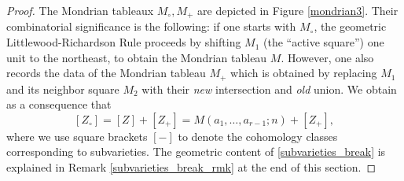 \begin{proof}
The Mondrian tableaux $M_\circ,M_+$ are depicted in Figure \ref{mondrian3}. Their combinatorial significance is the following: if one starts with $M_\circ$, the geometric Littlewood-Richardson Rule \cite[Algorithm 3.12, step GA2]{Cos09} proceeds by shifting $M_1$ (the ``active square'') one unit to the northeast, to obtain the Mondrian tableau $M$. However, one also records the data of the Mondrian tableau $M_+$ which is obtained by replacing $M_1$ and its neighbor square $M_2$ with their \emph{new} intersection and \emph{old} union. We obtain as a consequence \cite[Theorem 3.32]{Cos09} that
\begin{equation}\label{subvarieties_break}
[Z_\circ]=[Z]+[Z_+]=M(a_1,\ldots,a_{r-1};n)+[Z_+],
\end{equation}
where we use square brackets $[-]$ to denote the cohomology classes corresponding to subvarieties. The geometric content of \eqref{subvarieties_break} is explained in Remark \ref{subvarieties_break_rmk} at the end of this section.

%


\end{proof}
